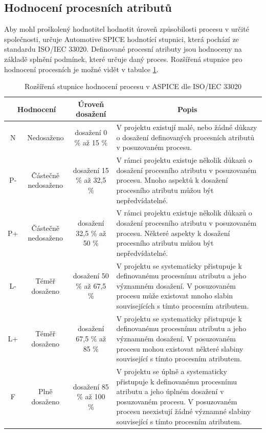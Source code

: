\documentclass[czech,master]{diploma}
\begin{document}
\subsection{Hodnocení procesních atributů}
\label{sec:process_atributes}
Aby mohl proškolený hodnotitel hodnotit úroveň způsobilosti procesu v určité společnosti, určuje Automotive SPICE hodnotící stupnici, která pochází ze standardu ISO/IEC 33020. Definované procesní atributy jsou hodnoceny na základě splnění podmínek, které určuje daný proces. Rozšířená stupnice pro hodnocení procesních je možné vidět v tabulce \ref{tab:aspice_rating_scale}.


\begin{table}[htp]
\begin{center}
\begin{tabular}{c | c | c | m{6cm}}

\multicolumn{2}{c|}{\textbf{Hodnocení}} & \multicolumn{1}{c|}{\textbf{Úroveň dosažení}} & \multicolumn{1}{c}{\textbf{Popis}} \\
\hline
\hline
N  & Nedosaženo & dosažení 0 \% až 15 \% & V projektu existují malé, nebo žádné důkazy o dosažení definovaných procesních atributů v posuzovaném procesu. \\
\hline
P- & Částečně nedosaženo & dosažení 15 \% až  32,5 \% & V rámci projektu existuje několik důkazů o dosažení procesního atributu v posuzovaném procesu. Mnoho aspektů k dosažení procesního atributu můžou být nepředvídatelné. \\
\hline
P+ & Částečně nedosaženo & dosažení  32,5 \% až 50 \% & V rámci projektu existuje několik důkazů o dosažení procesního atributu v posuzovaném procesu. Některé aspekty k dosažení procesního atributu můžou být nepředvídatelné. \\
\hline
L- & Téměř dosaženo & dosažení  50 \% až 67,5 \% & V projektu se systematicky přistupuje k  definovanému procesnímu atributu a jeho významném dosažení. V posuzovaném procesu může existovat mnoho slabin souvisejících s tímto procesním atributem. \\
\hline
L+ & Téměř dosaženo  & dosažení  67,5 \% až 85 \% & V projektu se systematicky přistupuje k definovanému procesnímu atributu a jeho významném dosažení. V posuzovaném procesu mohou existovat některé slabiny související s tímto procesním atributem. \\
\hline
F  & Plně dosaženo & dosažení  85 \% až 100 \% & V projektu se úplně a systematicky přistupuje k definovanému procesnímu atributu a jeho úplném dosažení v posuzovaném procesu. V posuzovaném procesu neexistují žádné významné slabiny související s tímto procesním atributem. \\
\end{tabular}
\caption{Rozšířená stupnice hodnocení procesu v ASPICE dle ISO/IEC 33020 \cite{ref:aspice_download_1523}}
\label{tab:aspice_rating_scale}
\end{center}
\end{table}
\end{document}
